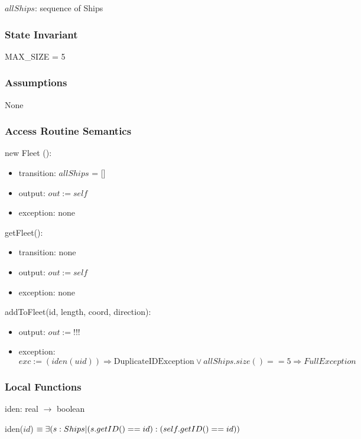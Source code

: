 \documentclass[12pt,fleqn]{article}
\begin{document}
    $allShips$: sequence of Ships

    \subsubsection* {State Invariant}

    MAX\_SIZE = 5

    \subsubsection* {Assumptions}
    None

    \subsubsection* {Access Routine Semantics}



    \noindent new Fleet ():
    \begin{itemize}
    \item transition: $allShips$ = []
    \item output: $out := \mathit{self}$
    \item exception: none
    \end{itemize}

    \noindent getFleet():
    \begin{itemize}
    \item transition: none
    \item output: $out := \mathit{self}$
    \item exception: none
    \end{itemize}

    \noindent addToFleet(id, length, coord, direction):
    \begin{itemize}
    \item output: $out := !!!$
    \item exception:  $exc := (iden(uid)) \Rightarrow  \mbox{DuplicateIDException} \lor allShips.size() == 5 \Rightarrow FullException $\\

    \end{itemize}

    \subsubsection*{Local Functions}

    \noindent iden: real $\rightarrow$ boolean

    \noindent iden($id$) $\equiv \exists (s : Ships | \mbox(s.getID() == id) : \mbox(self.getID() == id))$ \\
\end{document}
